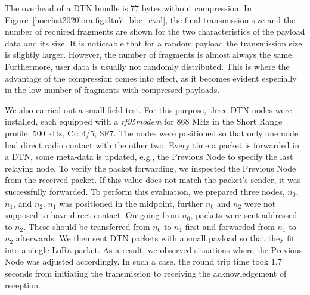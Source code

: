 The overhead of a DTN bundle is 77 bytes without compression.
In Figure~\ref{hoechst2020lora:fig:dtn7_bbc_eval}, the final transmission size and the number of required fragments are shown for the two characteristics of the payload data and its size.
It is noticeable that for a random payload the transmission size is slightly larger.
However, the number of fragments is almost always the same.
Furthermore, user data is usually not randomly distributed.
This is where the advantage of the compression comes into effect, as it becomes evident especially in the low number of fragments with compressed payloads.

We also carried out a small field test.
For this purpose, three DTN nodes were installed, each equipped with a \textit{rf95modem} for 868 MHz in the Short Range profile: 500 kHz, Cr: 4/5, SF7.
The nodes were positioned so that only one node had direct radio contact with the other two.
Every time a packet is forwarded in a DTN, some meta-data is updated, e.g., the Previous Node to specify the last relaying node.
To verify the packet forwarding, we inspected the Previous Node from the received packet.
If this value does not match the packet's sender, it was successfully forwarded.
To perform this evaluation, we prepared three nodes, $n_0$, $n_1$, and $n_2$.
$n_1$ was positioned in the midpoint, further $n_0$ and $n_2$ were not supposed to have direct contact.
Outgoing from $n_0$, packets were sent addressed to $n_2$.
These should be transferred from $n_0$ to $n_1$ first and forwarded from $n_1$ to $n_2$ afterwards.
We then sent DTN packets with a small payload so that they fit into a single LoRa packet.
As a result, we observed situations where the Previous Node was adjusted accordingly.
In such a case, the round trip time took 1.7 seconds from initiating the transmission to receiving the acknowledgement of reception.


